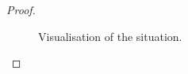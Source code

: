 \begin{proof}
\begin{figure}[h]
  \centering
  \def\svgwidth{0.7\textwidth}
  
  \caption{Visualisation of the situation.}
  \label{fi:n4_sigma}
\end{figure}
\end{proof}

\clearpage



\glsaddall
\printunsrtglossary[type=symbols,style=long]

\clearpage

\nocite{*}
\printbibliography


